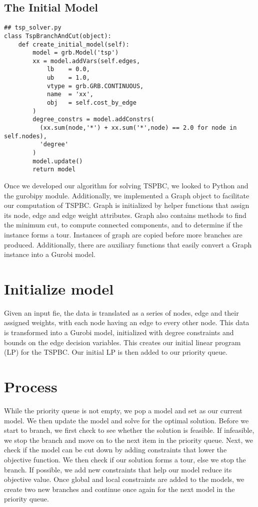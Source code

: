 \documentclass{article}
\begin{document}
\subsection{The Initial Model}
\begin{flushleft}

\begin{lstlisting}
## tsp_solver.py
class TspBranchAndCut(object):
    def create_initial_model(self):
        model = grb.Model('tsp')
        xx = model.addVars(self.edges,
            lb    = 0.0,
            ub    = 1.0,
            vtype = grb.GRB.CONTINUOUS,
            name  = 'xx',
            obj   = self.cost_by_edge
        )
        degree_constrs = model.addConstrs(
          (xx.sum(node,'*') + xx.sum('*',node) == 2.0 for node in self.nodes),
          'degree'
        )
        model.update()
        return model
\end{lstlisting}

\end{flushleft}

Once we developed our algorithm for solving TSPBC,
we looked to Python and the gurobipy module.
Additionally, we implemented a Graph object
to facilitate our computation of TSPBC.
Graph is initialized
by helper functions
that assign its node, edge and edge weight attributes.
Graph also contains
methods to find the minimum cut,
to compute connected components,
and to determine if the instance forms a tour.
Instances of graph are copied
before more branches are produced.
Additionally, there are auxiliary functions
that easily convert
a Graph instance into a Gurobi model.

\section{Initialize model}
Given an input fie,
the data is translated
as a series of nodes,
edge and their assigned weights,
with each node having an edge
to every other node.
This data is transformed
into a Gurobi model,
initialized with degree constraints
and bounds on the edge decision variables.
This creates our initial linear program (LP)
for the TSPBC.
Our initial LP is then added to our priority queue.

\section{Process}
While the priority queue is not empty,
we pop a model
and set as our current model.
We then update the model
and solve for the optimal solution.
Before we start to branch,
we first check to see
whether the solution is feasible.
If infeasible,
we stop the branch
and move on to the next item in the priority queue.
Next, we check if the model
can be cut down
by adding constraints
that lower the objective function.
We then check
if our solution forms a tour,
else we stop the branch.
If possible,
we add new constraints
that help our model
reduce its objective value.
Once global and local constraints
are added to the models,
we create two new branches
and continue once again
for the next model
in the priority queue.
\end{document}
